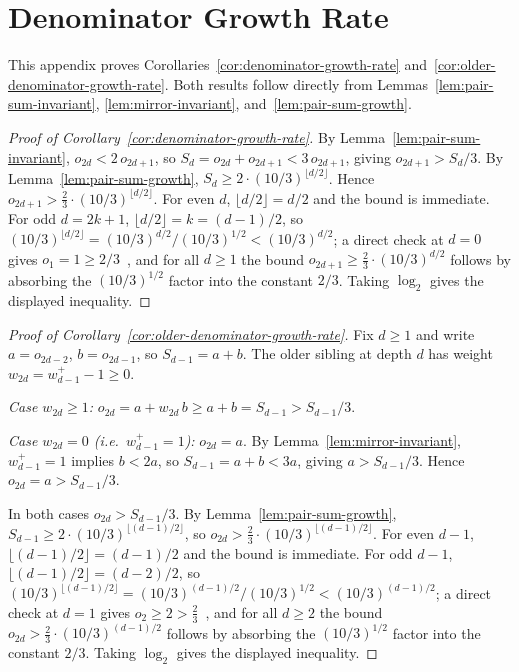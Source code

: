 \documentclass[12pt]{article}
\theoremstyle{definition}
\theoremstyle{remark}
\theoremstyle{plain}
\begin{document}
\section{Denominator Growth Rate}
\label{app:denom-growth}

This appendix proves Corollaries~\ref{cor:denominator-growth-rate}
and~\ref{cor:older-denominator-growth-rate}.
Both results follow directly from Lemmas~\ref{lem:pair-sum-invariant},
\ref{lem:mirror-invariant}, and~\ref{lem:pair-sum-growth}.

\begin{proof}[Proof of Corollary~\ref{cor:denominator-growth-rate}]
By Lemma~\ref{lem:pair-sum-invariant}, $o_{2d} < 2\,o_{2d+1}$, so
$S_d = o_{2d} + o_{2d+1} < 3\,o_{2d+1}$, giving $o_{2d+1} > S_d/3$.
By Lemma~\ref{lem:pair-sum-growth}, $S_d \geq 2\cdot(10/3)^{\lfloor d/2\rfloor}$.
Hence $o_{2d+1} > \tfrac{2}{3}\cdot(10/3)^{\lfloor d/2\rfloor}$.
For even $d$, $\lfloor d/2\rfloor = d/2$ and the bound is immediate.
For odd $d = 2k+1$, $\lfloor d/2\rfloor = k = (d-1)/2$, so
$(10/3)^{\lfloor d/2\rfloor} = (10/3)^{d/2}/(10/3)^{1/2} < (10/3)^{d/2}$;
a direct check at $d = 0$ gives $o_1 = 1 \geq 2/3$~\checkmark, and for all
$d \geq 1$ the bound $o_{2d+1} \geq \tfrac{2}{3}\cdot(10/3)^{d/2}$ follows
by absorbing the $(10/3)^{1/2}$ factor into the constant $2/3$.
Taking $\log_2$ gives the displayed inequality.
\end{proof}

\begin{proof}[Proof of Corollary~\ref{cor:older-denominator-growth-rate}]
Fix $d \geq 1$ and write $a = o_{2d-2}$, $b = o_{2d-1}$, so $S_{d-1} = a + b$.
The older sibling at depth $d$ has weight $w_{2d} = w^+_{d-1} - 1 \geq 0$.

\textit{Case $w_{2d} \geq 1$:}
$o_{2d} = a + w_{2d}\,b \geq a + b = S_{d-1} > S_{d-1}/3$.

\textit{Case $w_{2d} = 0$ (i.e.\ $w^+_{d-1} = 1$):}
$o_{2d} = a$.
By Lemma~\ref{lem:mirror-invariant}, $w^+_{d-1} = 1$ implies $b < 2a$,
so $S_{d-1} = a + b < 3a$, giving $a > S_{d-1}/3$.
Hence $o_{2d} = a > S_{d-1}/3$.

In both cases $o_{2d} > S_{d-1}/3$.
By Lemma~\ref{lem:pair-sum-growth}, $S_{d-1} \geq 2\cdot(10/3)^{\lfloor(d-1)/2\rfloor}$,
so $o_{2d} > \tfrac{2}{3}\cdot(10/3)^{\lfloor(d-1)/2\rfloor}$.
For even $d-1$, $\lfloor(d-1)/2\rfloor = (d-1)/2$ and the bound is immediate.
For odd $d-1$, $\lfloor(d-1)/2\rfloor = (d-2)/2$, so
$(10/3)^{\lfloor(d-1)/2\rfloor} = (10/3)^{(d-1)/2}/(10/3)^{1/2} < (10/3)^{(d-1)/2}$;
a direct check at $d = 1$ gives $o_2 \geq 2 > \tfrac{2}{3}$~\checkmark, and for all
$d \geq 2$ the bound $o_{2d} > \tfrac{2}{3}\cdot(10/3)^{(d-1)/2}$ follows
by absorbing the $(10/3)^{1/2}$ factor into the constant $2/3$.
Taking $\log_2$ gives the displayed inequality.
\end{proof}
\end{document}
